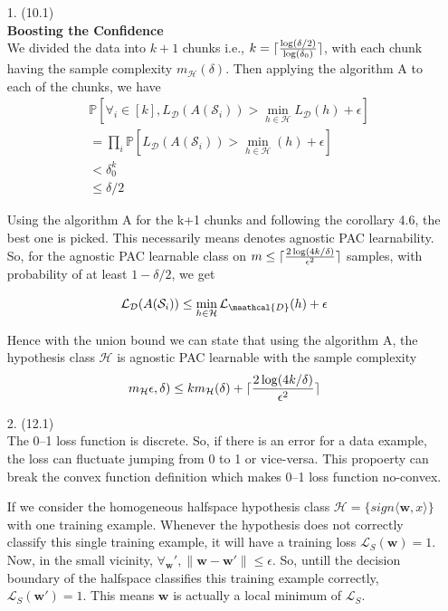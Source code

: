 \documentclass[12pt,letterpaper]{article}
\DeclarePairedDelimiter\ceil{\lceil}{\rceil}
\begin{document}
\begin{enumerate}
	

\item[1.] (10.1) \\
{\noindent}\textbf{Boosting the Confidence}\\
{\noindent}We divided the data into $k+1$ chunks i.e., $k=\ceil{\frac{\log(\delta/2)}{\log(\delta_0)}}$, with each chunk having the sample complexity $m_\mathcal{H}(\delta)$. Then applying the algorithm A to each of the chunks, we have
\begin{align*}
    &\mathbb{P}[\forall_i \in [k], L_{\mathcal{    D}}(A(\mathcal{S}_i)) > \min_{h\in\mathcal{H}}L_{\mathcal{D}}(h) + \epsilon]\\
    &=\prod_i \mathbb{P}[L_\mathcal{D}(A(\mathcal{S}_i)) > \min_{h\in\mathcal{H}}(h) + \epsilon]\\
    &< \delta_0^k\\
    &\leq \delta/2
\end{align*}

{\noindent}Using the algorithm A for the k+1 chunks and following the corollary 4.6, the best one is picked. This necessarily means denotes agnostic PAC learnability. So, for the agnostic PAC learnable class on $m\leq \ceil{\frac{2\log(4k/\delta)}{\epsilon^2}}$ samples, with probability of at least $1 - \delta/2$, we get

$$\mathcal{L}_\mathcal{D}(A(\mathcal{S}_i)) \leq \min_{h\in\mathcal{H}}\mathcal{L}_\maathcal{D}(h) + \epsilon$$ 

Hence with the union bound we can state that using the algorithm A, the hypothesis class $\mathcal{H}$ is agnostic PAC learnable with the sample complexity
\begin{align*}
    m_\mathcal{H}\epsilon, \delta) \leq km_\mathcal{H}(\delta) + \ceil{\frac{2\log(4k/\delta)}{\epsilon^2}}
\end{align*}



\clearpage

\item[2.] (12.1) \\
{\noindent}The 0--1 loss function is discrete. So, if there is an error for a data example, the loss can fluctuate jumping from 0 to 1 or vice-versa. This propoerty can break the convex function definition which makes 0--1 loss function no-convex. 

If we consider the homogeneous halfspace hypothesis class $\mathcal{H} = \{sign\langle \mathbf{w}, x\rangle\}$ with one training example. Whenever the hypothesis does not correctly classify this single training example, it will have a training loss $\mathcal{L}_S(\mathbf{w}) = 1$. Now, in the small vicinity, $\forall_\mathbf{w}', \|\mathbf{w}-\mathbf{w}'\| \leq \epsilon$. So, untill the decision boundary of the halfspace classifies this training example correctly, $\mathcal{L}_S(\mathbf{w}') = 1$. This means  $\mathbf{w}$ is actually a local minimum of $\mathcal{L}_S$. 


\end{enumerate}
\end{document}
